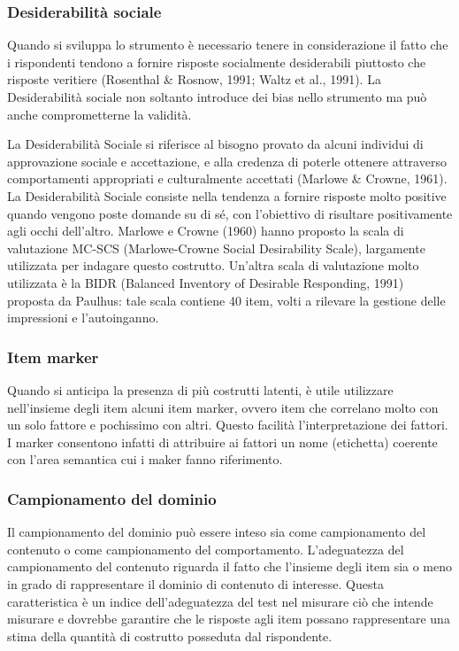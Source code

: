\subsubsection{Desiderabilità sociale} Quando si sviluppa lo strumento è necessario tenere in considerazione il fatto che i rispondenti tendono a fornire risposte socialmente desiderabili piuttosto che risposte veritiere (Rosenthal \& Rosnow, 1991; Waltz et al.,
1991). La Desiderabilità sociale non soltanto introduce dei bias nello strumento ma può anche comprometterne la validità.

La Desiderabilità Sociale si riferisce al bisogno provato da alcuni individui di approvazione sociale e accettazione, e alla credenza di poterle ottenere attraverso comportamenti appropriati e culturalmente accettati (Marlowe \& Crowne, 1961). La Desiderabilità Sociale consiste nella tendenza a fornire risposte molto positive quando vengono poste domande su di sé, con l'obiettivo di risultare positivamente agli occhi dell'altro. Marlowe e Crowne (1960) hanno proposto la scala di valutazione MC-SCS (Marlowe-Crowne Social Desirability Scale), largamente utilizzata per indagare questo costrutto. Un'altra scala di valutazione molto utilizzata è la BIDR (Balanced Inventory of Desirable Responding, 1991) proposta da Paulhus: tale scala contiene 40 item, volti a rilevare la gestione delle impressioni e l'autoinganno. 


\subsubsection{Item marker}

Quando si anticipa la presenza di più costrutti latenti, è utile utilizzare nell'insieme degli item alcuni item marker, ovvero item che correlano molto con un solo fattore e pochissimo con altri. Questo facilità l'interpretazione dei fattori.  I  marker consentono infatti di attribuire ai fattori un nome (etichetta) coerente con l'area semantica cui i maker fanno riferimento. 

\subsubsection{Campionamento del dominio}

Il campionamento del dominio può essere inteso sia come campionamento del contenuto o come campionamento del comportamento. L'adeguatezza del campionamento del contenuto riguarda il fatto che l'insieme degli item sia o meno in grado di rappresentare il dominio di contenuto di interesse. Questa caratteristica è un indice dell'adeguatezza del test nel misurare ciò che intende misurare e dovrebbe garantire che le risposte agli item possano rappresentare una stima della quantità di costrutto posseduta dal rispondente. 

